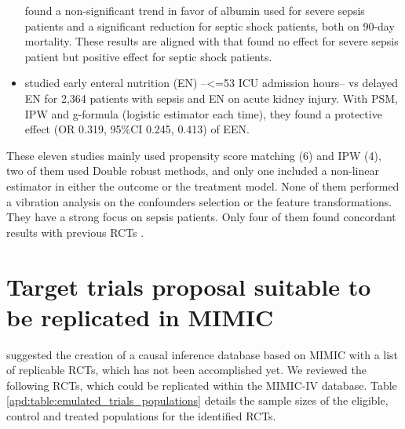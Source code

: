 \documentclass[french,12pt,twoside,a4paper]{book}
\begin{document}
\begin{appendices}
\begin{itemize}
          found a non-significant trend
          in favor of albumin used for severe sepsis patients and a significant
          reduction for septic shock patients, both on 90-day mortality. These
          results are aligned with \cite{caironi2014albumin} that found no effect
          for severe sepsis patient but positive effect for septic shock patients.
    \item \cite{wang2023early} studied \textcolor{I}{early enteral nutrition (EN)
            --<=53 ICU admission hours--} vs \textcolor{C}{delayed EN} for
          \textcolor{P}{2,364 patients with sepsis and EN} on
          \textcolor{O}{acute kidney injury}. With PSM, IPW and g-formula
          (logistic estimator each time), they found a protective effect
          (OR 0.319, 95\%CI 0.245, 0.413) of EEN.
  \end{itemize}

  These eleven studies mainly used propensity score matching (6) and IPW (4), two of
  them used Double robust methods, and only one included a non-linear estimator in
  either the outcome or the treatment model. None of them performed a vibration
  analysis on the confounders selection or the feature transformations. They have a
  strong focus on sepsis patients. Only four of them found concordant results with
  previous RCTs \citep{liu2021effects,shahn2020fluid,adibuzzaman2019323}.

  \section{Target trials proposal suitable to be replicated in MIMIC}\label{apd:target_trials}

  \cite{guzmanopen} suggested the creation of a causal inference database based
  on MIMIC with a list of replicable RCTs, which has not been
  accomplished yet. We reviewed the following RCTs, which could be replicated within the MIMIC-IV
  database. Table \ref{apd:table:emulated_trials_populations} details the sample
  sizes of the eligible, control and treated populations for the identified RCTs.



\end{appendices}
\end{document}
